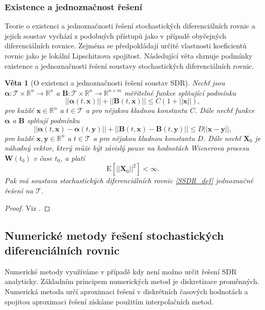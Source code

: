 \documentclass[a4paper,12pt]{report}
\newtheorem{veta}{Věta}
\theoremstyle{definition} \newtheorem{definice}[veta]{Definice}
\theoremstyle{remark}
\begin{document}
\subsubsection{Existence a jednoznačnost řešení}
Teorie o existenci a jednoznačnosti řešení stochastických diferenciálních rovnic a jejich soustav vychází z podobných přístupů jako v případě obyčejných diferenciálních rovnice.
Zejména se předpokládají určité vlastnosti koeficientů rovnic jako je lokální Lipschitzova spojitost.
Následující věta shrnuje podmínky existence a jednoznačnosti řešení soustavy stochastických diferenciálních rovnic.
\begin{veta}[O existenci a jednoznačnosti řešení soustav SDR]
Nechť jsou $\boldsymbol\alpha:\mathcal{T}\times\mathbb{R}^n\to\mathbb{R}^n$ a $\boldsymbol{B}:\mathcal{T}\times\mathbb{R}^n\to\mathbb{R}^{n\times m}$ měřitelné funkce splňující podmínku
\begin{equation}\label{glob_Lipschitzova_podminka}
||\boldsymbol\alpha( t,\boldsymbol x)||+||\boldsymbol{B}( t,\boldsymbol x)||\leq C(1+{||\boldsymbol x||}),
\end{equation}
pro každé $\boldsymbol x\in\mathbb{R}^n$ a $t\in \mathcal{T}$ a pro nějakou kladnou konstantu $C$.
Dále nechť funkce $\boldsymbol\alpha$ a $\boldsymbol B$ splňují podmínku
\begin{equation}\label{loc_Lipschitzova_podminka}
||\boldsymbol\alpha( t,\boldsymbol x)-\boldsymbol\alpha( t,\boldsymbol y)||+||\boldsymbol{B}( t,\boldsymbol x)-\boldsymbol{B}( t,\boldsymbol y)||\leq D||\boldsymbol x-\boldsymbol y||,
\end{equation}
pro každé $\boldsymbol x , \boldsymbol y\in\mathbb{R}^n$ a $t\in \mathcal{T}$ a pro nějakou kladnou konstantu $D$.
Dále nechť $\boldsymbol X_0$ je náhodný vektor, který může být závislý pouze na hodnotách Wienerova procesu $\boldsymbol W(t_0)$ v čase $t_0$, %
a platí
\begin{equation}\label{podminka_tri}
\mathrm{E}\left[||\boldsymbol X_0||^2\right]<\infty.
\end{equation} 
Pak má soustava stochastických diferenciálních rovnic \eqref{SSDR_def} jednoznačné řešení na $\mathcal{T}$.
\end{veta}
\begin{proof}
Viz \cite{oksendal2003stochastic}.
\end{proof}

\subsection{Numerické metody řešení stochastických diferenciálních rovnic}\label{numericke_metody_kap}
Numerické metody využíváme v případě kdy není možno určit řešení SDR analyticky.
Základním principem numerických metod je diskretizace proměnných.
Numerická metoda určí aproximaci řešení v diskrétních časových hodnotách a spojitou aproximaci řešení získáme použitím interpolačních metod.
\end{document}
